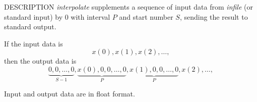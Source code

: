 % 
% 
% 
% 
%                                                                        
%

\begin{synopsis}
\item[interpolate] [ --p $P$ ] [ --s $S$ ] [ {\em infile} ]
\end{synopsis}

\begin{qsection}{DESCRIPTION}
{\em interpolate} supplements a sequence of input data
from {\em infile} (or standard input)
by 0 with interval $P$ and start number $S$,
sending the result to standard output.

If the input data is
\begin{displaymath}
 x(0), x(1), x(2), \ldots,
\end{displaymath}
then the output data is
\begin{displaymath}
\underbrace{0, 0, \ldots, 0}_{S-1},\underbrace{x(0), 0, 0, \ldots, 0}_{P},\underbrace{x(1), 0, 0, \ldots, 0}_{P},x(2), \ldots,
\end{displaymath}
\par
Input and output data are in float format.
\end{qsection}

